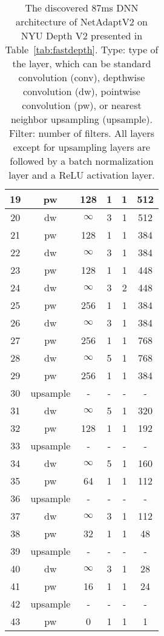 \begin{table*}[t]
\begin{tabular}{c|c|c|c|c|c}
19    & pw       & 128 & 1           & 1      & 512 \\ \hline
20    & dw       & $\infty$ & 3           & 1      & 512 \\ \hline
21    & pw       & 128 & 1           & 1      & 384 \\ \hline
22    & dw       & $\infty$ & 3           & 1      & 384 \\ \hline
23    & pw       & 128 & 1           & 1      & 448 \\ \hline
24    & dw       & $\infty$ & 3           & 2      & 448 \\ \hline
25    & pw       & 256 & 1           & 1      & 384 \\ \hline
26    & dw       & $\infty$ & 3           & 1      & 384 \\ \hline
27    & pw       & 256 & 1           & 1      & 768 \\ \hline
28    & dw       & $\infty$ & 5           & 1      & 768 \\ \hline
29    & pw       & 256 & 1           & 1      & 384 \\ \hline
30    & upsample & -   & -           & -      & -   \\ \hline
31    & dw       & $\infty$ & 5           & 1      & 320 \\ \hline
32    & pw       & 128 & 1           & 1      & 192 \\ \hline
33    & upsample & -   & -           & -      & -   \\ \hline
34    & dw       & $\infty$ & 5           & 1      & 160 \\ \hline
35    & pw       & 64  & 1           & 1      & 112 \\ \hline
36    & upsample & -   & -           & -      & -   \\ \hline
37    & dw       & $\infty$ & 3           & 1      & 112 \\ \hline
38    & pw       & 32  & 1           & 1      & 48  \\ \hline
39    & upsample & -   & -           & -      & -   \\ \hline
40    & dw       & $\infty$ & 3           & 1      & 28  \\ \hline
41    & pw       & 16  & 1           & 1      & 24  \\ \hline
42    & upsample & -   & -           & -      & -   \\ \hline
43    & pw       & 0   & 1           & 1      & 1   \\ \toprule
\end{tabular}
\caption{The discovered 87ms DNN architecture of NetAdaptV2 on NYU Depth V2 presented in Table~\ref{tab:fastdepth}. Type: type of the layer, which can be standard convolution (conv), depthwise convolution (dw), pointwise convolution (pw), or nearest neighbor upsampling (upsample). Filter: number of filters. All layers except for upsampling layers are followed by a batch normalization layer and a ReLU activation layer.}
\label{tab:discovered_architecture_fastdepth}
\end{table*}

